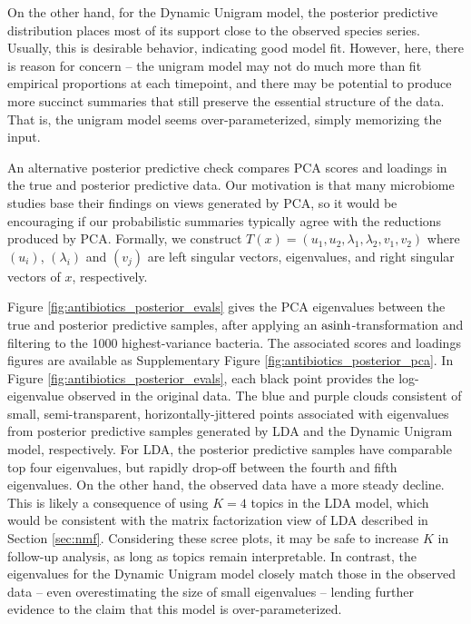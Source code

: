 \documentclass[oupdraft]{bio}
\begin{document}
On the other hand, for the Dynamic Unigram model, the posterior predictive
distribution places most of its support close to the observed species series.
Usually, this is desirable behavior, indicating good model fit. However, here,
there is reason for concern -- the unigram model may not do much more than fit
empirical proportions at each timepoint, and there may be potential to produce
more succinct summaries that still preserve the essential structure of the data.
That is, the unigram model seems over-parameterized, simply memorizing the
input.

An alternative posterior predictive check compares PCA scores and loadings in
the true and posterior predictive data. Our motivation is that many microbiome
studies base their findings on views generated by PCA, so it would be
encouraging if our probabilistic summaries typically agree with the reductions
produced by PCA. Formally, we construct $T\left(x\right) = \left(u_{1}, u_{2},
\lambda_{1}, \lambda_{2}, v_{1}, v_{2}\right)$ where $\left(u_{i}\right)$,
$\left(\lambda_{i}\right)$ and $\left(v_{j}\right)$ are left singular vectors,
eigenvalues, and right singular vectors of $x$, respectively.

Figure \ref{fig:antibiotics_posterior_evals} gives the PCA eigenvalues between
the true and posterior predictive samples, after applying an
$\mathop\mathrm{asinh}$-transformation and filtering to the 1000 highest-variance bacteria. The
associated scores and loadings figures are available as Supplementary Figure
\ref{fig:antibiotics_posterior_pca}. In Figure
\ref{fig:antibiotics_posterior_evals}, each black point provides the
log-eigenvalue observed in the original data. The blue and purple clouds
consistent of small, semi-transparent, horizontally-jittered points associated
with eigenvalues from posterior predictive samples generated by LDA and the
Dynamic Unigram model, respectively. For LDA, the posterior predictive samples
have comparable top four eigenvalues, but rapidly drop-off between the fourth
and fifth eigenvalues. On the other hand, the observed data have a more steady
decline. This is likely a consequence of using $K = 4$ topics in the LDA model,
which would be consistent with the matrix factorization view of LDA described in
Section \ref{sec:nmf}. Considering these scree plots, it may be safe to increase
$K$ in follow-up analysis, as long as topics remain interpretable. In contrast,
the eigenvalues for the Dynamic Unigram model closely match those in the
observed data -- even overestimating the size of small eigenvalues -- lending
further evidence to the claim that this model is over-parameterized.
\end{document}

